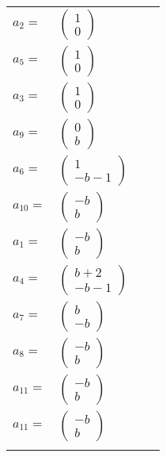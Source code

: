 \documentclass[1p]{elsarticle_modified}
\theoremstyle{definition}
\begin{document}
\begin{tabular}{m{7pt} m{180pt} m{7pt} m{180pt} }
\flushright $a_{2}=$&$\begin{pmatrix}1\\0\end{pmatrix}$ \\
\flushright $a_{5}=$&$\begin{pmatrix}1\\0\end{pmatrix}$ \\
\flushright $a_{3}=$&$\begin{pmatrix}1\\0\end{pmatrix}$ \\
\flushright $a_{9}=$&$\begin{pmatrix}0\\b\end{pmatrix}$ \\
\flushright $a_{6}=$&$\begin{pmatrix}1\\- b-1\end{pmatrix}$ \\
\flushright $a_{10}=$&$\begin{pmatrix}- b\\b\end{pmatrix}$ \\
\flushright $a_{1}=$&$\begin{pmatrix}- b\\b\end{pmatrix}$ \\
\flushright $a_{4}=$&$\begin{pmatrix}b+2\\- b-1\end{pmatrix}$ \\
\flushright $a_{7}=$&$\begin{pmatrix}b\\- b\end{pmatrix}$ \\
\flushright $a_{8}=$&$\begin{pmatrix}- b\\b\end{pmatrix}$ \\
\flushright $a_{11}=$&$\begin{pmatrix}- b\\b\end{pmatrix}$\\ \flushright $a_{11}=$&$\begin{pmatrix}- b\\b\end{pmatrix}$\\&\end{tabular}
\end{document}
